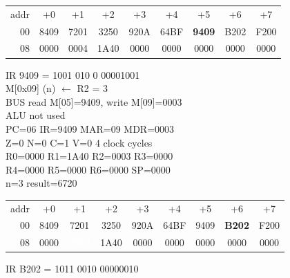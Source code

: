 \begin{tcolorbox}[stepbox, title={Step 25 \hfill PC 04 \quad ADDI R2, R2, -1}]
{\begin{tabular}{@{}r*{8}{c}@{}}
\textcolor{dim}{addr} & \textcolor{dim}{+0} & \textcolor{dim}{+1} & \textcolor{dim}{+2} & \textcolor{dim}{+3} & \textcolor{dim}{+4} & \textcolor{dim}{+5} & \textcolor{dim}{+6} & \textcolor{dim}{+7}\\
\textcolor{dim}{00} & 8409 & 7201 & 3250 & 920A & 64BF & \cellcolor{pcc}\textbf{9409} & B202 & F200\\
\textcolor{dim}{08} & 0000 & \cellcolor{datac}0004 & \cellcolor{datac}1A40 & 0000 & 0000 & 0000 & 0000 & 0000\\
\end{tabular}}
\end{tcolorbox}\par\vspace{3pt}
\noindent\begin{tcolorbox}[stepbox, title={Step 26 \hfill PC 05 \quad ST R2, n}]
\textcolor{dim}{IR} 9409 = 1001 010 0 00001001\\
M[0x09] (n) $\leftarrow$ R2 = 3\\
\textcolor{dim}{BUS} read M[05]=9409, \textcolor{wrt}{write M[09]=0003}\\
\textcolor{dim}{ALU} \textcolor{dim}{not used}\\
PC=06 IR=9409 MAR=09 MDR=0003\\
Z=0 N=0 C=1 V=0 \hfill \textcolor{dim}{4 clock cycles}\\
R0=0000 R1=1A40 R2=0003 R3=0000\\
R4=0000 R5=0000 R6=0000 SP=0000\\
\textcolor{dim}{n=3  result=6720}\\[1pt]
{\setlength{\tabcolsep}{1.6pt}\begin{tabular}{@{}r*{8}{c}@{}}
\textcolor{dim}{addr} & \textcolor{dim}{+0} & \textcolor{dim}{+1} & \textcolor{dim}{+2} & \textcolor{dim}{+3} & \textcolor{dim}{+4} & \textcolor{dim}{+5} & \textcolor{dim}{+6} & \textcolor{dim}{+7}\\
\textcolor{dim}{00} & 8409 & 7201 & 3250 & 920A & 64BF & 9409 & \cellcolor{pcc}\textbf{B202} & F200\\
\textcolor{dim}{08} & 0000 & \cellcolor{wrt}\textcolor{white}{\textbf{0003}} & \cellcolor{datac}1A40 & 0000 & 0000 & 0000 & 0000 & 0000\\
\end{tabular}}
\end{tcolorbox}\hfill\begin{tcolorbox}[stepbox, title={Step 27 \hfill PC 06 \quad BNE loop}]
\textcolor{dim}{IR} B202 = 1011 0010 00000010\\

\end{tcolorbox}
